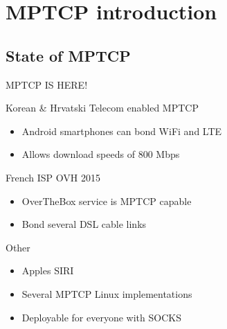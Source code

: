 \documentclass{beamer}
\begin{document}
\begin{frame}[plain]
  \titlepage{}
\end{frame}

\begin{frame}[allowframebreaks]{}
  \tableofcontents
\end{frame}

\section{MPTCP introduction}
\subsection{State of MPTCP}
\begin{frame}{MPTCP IS HERE!}
  \vspace{-0.3cm}
  \begin{block}{\normalsize Korean \& Hrvatski Telecom enabled MPTCP}
    \begin{itemize}
      \small
      \setlength\itemsep{0em}
      \item Android smartphones can bond WiFi and LTE
      \item Allows download speeds of 800 Mbps
      \end{itemize}
  \end{block}


  \begin{block}{\normalsize French ISP OVH 2015}
    \begin{itemize}
      \small
      \setlength\itemsep{0em}
      \item OverTheBox service is MPTCP capable
      \item Bond several DSL cable links
    \end{itemize}
  \end{block}


  \begin{block}{\normalsize Other}
    \begin{itemize}
      \small
      \setlength\itemsep{0em}
      \item Apples SIRI
      \item Several MPTCP Linux implementations
      \item Deployable for everyone with SOCKS
    \end{itemize}
  \end{block}
\end{frame}
\end{document}
